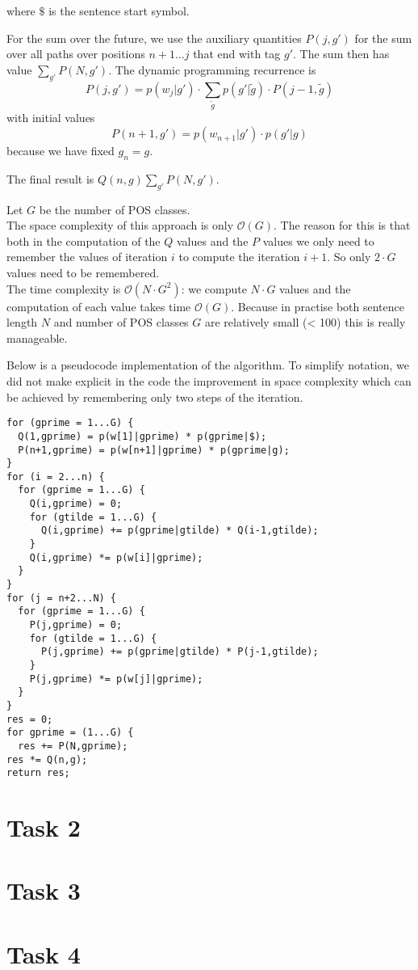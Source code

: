 \documentclass[%
   11pt,              %
   ngerman,           %
   a4paper,           %
   DIV11,             %
]{scrartcl}%
\begin{document}
where $\$ $ is the sentence start symbol. \par
For the sum over the future, we use the auxiliary quantities $P(j,g')$ for the sum over all paths over positions $n+1\ldots j$ that end with tag $g'$. The sum then has value $\sum_{g'} P(N,g')$. The dynamic programming recurrence is
\begin{equation*}
	P(j,g') = p(w_j|g') \cdot \sum_{\tilde{g}} p(g'|\tilde{g}) \cdot P(j-1,\tilde{g}) 
\end{equation*}
with initial values
\begin{equation*}
	P(n+1,g') = p(w_{n+1}|g') \cdot p(g'|g)
\end{equation*}
because we have fixed $g_n = g$. \par
The final result is $Q(n,g) \sum_{g'} P(N,g')$. \par
Let $G$ be the number of POS classes. \\ The space complexity of this approach is only $\mathcal{O}(G)$. The reason for this is that both in the computation of the $Q$ values and the $P$ values we only need to remember the values of iteration $i$ to compute the iteration $i+1$. So only $2 \cdot G$ values need to be remembered.\\
The time complexity is $\mathcal{O}(N \cdot G^2)$: we compute $N \cdot G$ values and the computation of each value takes time $\mathcal{O}(G)$. Because in practise both sentence length $N$ and number of POS classes $G$ are relatively small (< 100) this is really manageable. \par
Below is a pseudocode implementation of the algorithm. To simplify notation, we did not make explicit in the code the improvement in space complexity which can be achieved by remembering only two steps of the iteration.
\lstset{language=C, showstringspaces=false}
\begin{lstlisting}
for (gprime = 1...G) {
  Q(1,gprime) = p(w[1]|gprime) * p(gprime|$);
  P(n+1,gprime) = p(w[n+1]|gprime) * p(gprime|g);
}
for (i = 2...n) {
  for (gprime = 1...G) {
    Q(i,gprime) = 0;
	for (gtilde = 1...G) {
	  Q(i,gprime) += p(gprime|gtilde) * Q(i-1,gtilde);
	}
    Q(i,gprime) *= p(w[i]|gprime);
  }
}
for (j = n+2...N) {
  for (gprime = 1...G) {
	P(j,gprime) = 0;
	for (gtilde = 1...G) {
	  P(j,gprime) += p(gprime|gtilde) * P(j-1,gtilde);
	}
	P(j,gprime) *= p(w[j]|gprime);
  }
}
res = 0;
for gprime = (1...G) {
  res += P(N,gprime);
res *= Q(n,g);
return res;
\end{lstlisting}
\section*{Task 2}
\section*{Task 3}
\section*{Task 4}
\end{document}
